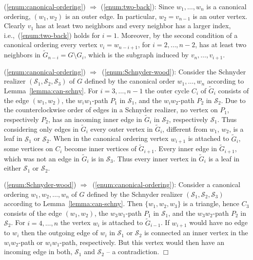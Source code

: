 \documentclass[11pt]{article}
\newenvironment{proof}{{\bf Proof:} }{\hspace*{\fill}$\Box$\vspace{2mm}}
\begin{document}
\begin{proof}
  (\ref{enum:canonical-ordering}) $\Longrightarrow$ (\ref{enum:two-back}):
  Since $w_1,\dots,w_n$ is a canonical ordering, $(w_1,w_2)$ is an outer edge. In
  particular, $w_2 = v_{n-1}$ is an outer vertex. Clearly $v_1$ has at
  least two neighbors and every neighbor has a larger index,
  i.e.,~(\ref{enum:two-back}) holds for $i=1$.  Moreover, by the second
  condition of a canonical ordering every vertex $v_i = w_{n-i+1}$,
  for $i=2,\ldots,n-2$, has at least two neighbors in $\tilde{G}_{n-i}
  = G \setminus G_i$, which is the subgraph induced by
  $v_n,\ldots,v_{i+1}$.

 (\ref{enum:canonical-ordering})
$\Longrightarrow$~(\ref{enum:Schnyder-wood}): Consider the Schnyder
realizer $(\mathcal{S}_1,\mathcal{S}_2,\mathcal{S}_3)$ of $G$ defined
by the canonical order $w_1,\ldots,w_n$ according to
Lemma~\ref{lemma:can-schny}. For $i=3,\ldots,n-1$ the outer cycle
$C_i$ of $\tilde{G}_i$ consists of the edge $(w_1,w_2)$, the
$w_iw_1$-path $P_1$ in $\mathcal{S}_1$, and the $w_iw_2$-path $P_2$ in
$\mathcal{S}_2$. Due to the counterclockwise order of edges in a
Schnyder realizer, no vertex on $P_1$, respectively $P_2$, has an
incoming inner edge in $\tilde{G}_i$ in $\mathcal{S}_2$, respectively
$\mathcal{S}_1$. Thus considering only edges in $\tilde{G}_i$ every
outer vertex in $\tilde{G}_i$, different from $w_1$, $w_2$, is a leaf
in $\mathcal{S}_1$ or $\mathcal{S}_2$. When in the canonical ordering
vertex $w_{i+1}$ is attached to $\tilde{G}_i$, some vertices on $C_i$
become inner vertices of $\tilde{G}_{i+1}$. Every inner edge in
$\tilde{G}_{i+1}$, which was not an edge in $\tilde{G}_i$ is in
$\mathcal{S}_3$. Thus every inner vertex in $\tilde{G}_i$ is a leaf in
either $\mathcal{S}_1$ or $\mathcal{S}_2$.

 (\ref{enum:Schnyder-wood})
$\Longrightarrow$~(\ref{enum:canonical-ordering}): Consider a
canonical ordering $w_1,w_2,\ldots,w_n$ of $G$ defined by the Schnyder
realizer $(\mathcal{S}_1,\mathcal{S}_2,\mathcal{S}_3)$ according to
Lemma~\ref{lemma:can-schny}. Then $\{w_1,w_2,w_3\}$ is a triangle,
hence $C_3$ consists of the edge $(w_1,w_2)$, the $w_3w_1$-path $P_1$
in $\mathcal{S}_1$, and the $w_3w_2$-path $P_2$ in
$\mathcal{S}_2$. For $i = 4,\ldots,n$ the vertex $w_i$ is attached to
$\tilde{G}_{i-1}$. If $w_{i+1}$ would have no edge to $w_i$ then the
outgoing edge of $w_i$ in $\mathcal{S}_1$ or $\mathcal{S}_2$ is
connected an inner vertex in the $w_iw_2$-path or $w_iw_1$-path,
respectively. But this vertex would then have an incoming edge in
both, $\mathcal{S}_1$ and $\mathcal{S}_2$ -- a contradiction.
\end{proof}
\end{document}
